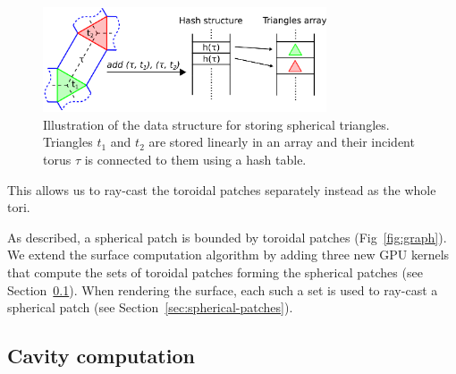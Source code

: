 \begin{figure}[htb]
  \centering
  \includegraphics[width=3.3in]{image/hashing.png}
  \caption{Illustration of the data structure for storing spherical triangles. Triangles $t_1$ and $t_2$ are stored linearly in an array and their incident torus $\tau$ is connected to them using a hash table.}
	\label{fig:hashing41}
\end{figure}

This allows us to ray-cast the toroidal patches separately instead as the whole tori.

As described, a spherical patch is bounded by toroidal patches (Fig~\ref{fig:graph}). 
We extend the surface computation algorithm by adding three new GPU kernels that compute the sets of toroidal patches forming the spherical patches (see Section~\ref{sec:graph}).
When rendering the surface, each such a set is used to ray-cast a spherical patch (see Section~\ref{sec:spherical-patches}).


\subsection{Cavity computation}
\label{sec:graph}
   
